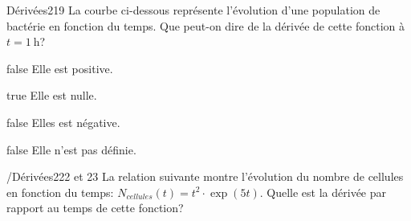             \begin{question}{20}{Dérivées}{2}{19}
            La courbe ci-dessous représente l'évolution d'une population de bactérie en fonction du temps. Que peut-on dire de la dérivée de cette fonction à $t=\SI{1}{\hour}$?
            \begin{figure}[!h]
	          \begin{center}
              \end{center}
              \end{figure}
        \end{question}
        \begin{reponses}
            	\item[false]  Elle est positive.
            	\item[true]  Elle est nulle.
                \item[false]  Elles est négative.
                \item[false]   Elle n'est pas définie.
            \end{reponses}
			 \begin{question}{/}{Dérivées}{2}{22 et 23}
				La relation suivante montre l'évolution du nombre de cellules en fonction du temps: $N_{cellules}(t)=t^{2}\cdot\exp(5t)$. Quelle est la dérivée par rapport au temps de cette fonction?
            \end{question}
